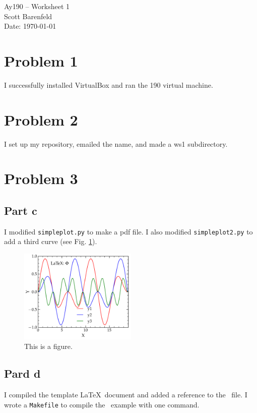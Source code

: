 \documentclass[11pt,letterpaper]{article}
\begin{document}
\begin{center}
\Large
Ay190 -- Worksheet 1\\
Scott Barenfeld\\
Date: \today
\end{center}

\section{Problem 1}
I successfully installed VirtualBox and ran the 190 virtual machine.








\section{Problem 2}
I set up my repository, emailed the name, and made a ws1 subdirectory.

\section{Problem 3}
\subsection{Part c}
I modified \texttt{simpleplot.py} to make a pdf file.  I also modified 
\texttt{simpleplot2.py} to add a third curve (see Fig. \ref{fig:simpleplot2}).

\begin{figure}[bth]
\centering
\includegraphics[width=0.5\textwidth]{simpleplot2.pdf}
\caption{This is a figure.}
\label{fig:simpleplot2}
\end{figure}

\subsection{Pard d}
I compiled the template \LaTeX\, document and added a reference to the \BibTeX\, file.  
I wrote a \texttt{Makefile} to compile the \BibTeX\, example with one command.
\end{document}

